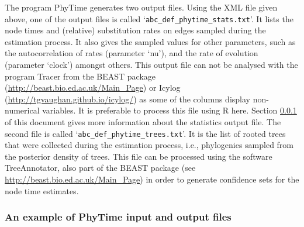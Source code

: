 \documentclass[a4paper,12pt]{article}
\newcommand{\x}[1]{\texttt{#1}}
\begin{document}
The     program     PhyTime     generates     two     output     files.      Using the XML file
given above, one of the output files is called  `\x{abc\_def\_phytime\_stats.txt}'. It lists the
node times  and (relative) substitution rates on edges  sampled during the  estimation process.   It
also  gives the sampled values for other parameters, such as  the autocorrelation of rates
(parameter `nu'), and the rate of evolution (parameter `clock') amongst others.   This output file
can not be analysed with the program        Tracer        from         the
BEAST        package (\url{http://beast.bio.ed.ac.uk/Main_Page}) or Icylog
(\url{http://tgvaughan.github.io/icylog/}) as some of the columns display
non-numerical variables. It is preferable to process this file using R here. Section
\ref{sec:phytimeexample} of this document gives more information about the statistics output file.       The       second      file       is
called `\x{abc\_def\_phytime\_trees.txt}'.  It is  the list of rooted trees that were  collected
during the estimation process, i.e., phylogenies sampled from the posterior density of trees.  This
file can be processed   using   the   software   TreeAnnotator,   also  part   of   the   BEAST
package   (see \url{http://beast.bio.ed.ac.uk/Main_Page}) in  order to generate  confidence sets for
the  node time estimates.


\subsubsection{An example of PhyTime input and output files}\label{sec:phytimeexample}
\end{document}

